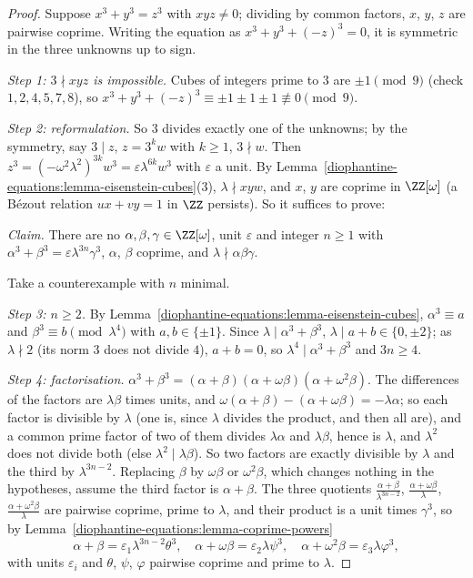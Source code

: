 \begin{proof}
Suppose $x^3 + y^3 = z^3$ with $xyz \neq 0$; dividing by common factors, $x$, $y$, $z$ are pairwise coprime. Writing the equation as $x^3 + y^3 + (-z)^3 = 0$, it is symmetric in the three unknowns up to sign.

\emph{Step 1: $3 \nmid xyz$ is impossible.} Cubes of integers prime to $3$ are $\pm1 \pmod 9$ (check $1, 2, 4, 5, 7, 8$), so $x^3 + y^3 + (-z)^3 \equiv \pm1 \pm 1 \pm 1 \not\equiv 0 \pmod 9$.

\emph{Step 2: reformulation.} So $3$ divides exactly one of the unknowns; by the symmetry, say $3 \mid z$, $z = 3^kw$ with $k \geq 1$, $3 \nmid w$. Then $z^3 = (-\omega^2\lambda^2)^{3k}w^3 = \varepsilon\lambda^{6k}w^3$
with $\varepsilon$ a unit. By Lemma~\ref{diophantine-equations:lemma-eisenstein-cubes}(3), $\lambda \nmid xyw$, and $x$, $y$ are coprime in $\ZZ[\omega]$ (a Bézout relation $ux + vy = 1$ in $\ZZ$ persists). So it
suffices to prove:

\emph{Claim.} There are no $\alpha, \beta, \gamma \in \ZZ[\omega]$, unit $\varepsilon$ and integer $n \geq 1$ with $\alpha^3 + \beta^3 = \varepsilon\lambda^{3n}\gamma^3$, $\alpha$, $\beta$ coprime, and
$\lambda \nmid \alpha\beta\gamma$.

Take a counterexample with $n$ minimal.

\emph{Step 3: $n \geq 2$.} By Lemma~\ref{diophantine-equations:lemma-eisenstein-cubes}, $\alpha^3 \equiv a$ and $\beta^3 \equiv b \pmod{\lambda^4}$ with $a, b \in \{\pm1\}$. Since $\lambda \mid \alpha^3 + \beta^3$,
$\lambda \mid a + b \in \{0, \pm2\}$; as $\lambda \nmid 2$ (its norm $3$ does not divide $4$), $a + b = 0$, so $\lambda^4 \mid \alpha^3 + \beta^3$ and $3n \geq 4$.

\emph{Step 4: factorisation.} $\alpha^3 + \beta^3 = (\alpha + \beta)(\alpha + \omega\beta)(\alpha + \omega^2\beta)$. The differences of the factors are $\lambda\beta$ times units, and
$\omega(\alpha + \beta) - (\alpha + \omega\beta) = -\lambda\alpha$; so each factor is divisible by $\lambda$ (one is, since $\lambda$ divides the product, and then all are), and a common prime factor of two
of them divides $\lambda\alpha$ and $\lambda\beta$, hence is $\lambda$, and $\lambda^2$ does not divide both (else $\lambda^2 \mid \lambda\beta$). So two factors are exactly divisible by $\lambda$ and the third by
$\lambda^{3n - 2}$. Replacing $\beta$ by $\omega\beta$ or $\omega^2\beta$, which changes nothing in the hypotheses, assume the third factor is $\alpha + \beta$. The three quotients
$\frac{\alpha + \beta}{\lambda^{3n - 2}}$, $\frac{\alpha + \omega\beta}{\lambda}$, $\frac{\alpha + \omega^2\beta}{\lambda}$ are pairwise coprime, prime to $\lambda$, and their product is a unit times $\gamma^3$, so
by Lemma~\ref{diophantine-equations:lemma-coprime-powers}
\[
\alpha + \beta = \varepsilon_1\lambda^{3n - 2}\theta^3, \quad \alpha + \omega\beta = \varepsilon_2\lambda\psi^3, \quad \alpha + \omega^2\beta = \varepsilon_3\lambda\varphi^3,
\]
with units $\varepsilon_i$ and $\theta$, $\psi$, $\varphi$ pairwise coprime and prime to $\lambda$.


\end{proof}
